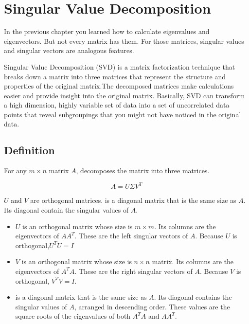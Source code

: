 \chapter{Singular Value Decomposition}

In the previous chapter you learned how to calculate eigenvalues and eigenvectors. But not every matrix has them. For those matrices, singular values and singular vectors are analogous features. 

Singular Value Decomposition (SVD) is a matrix factorization technique that breaks down a matrix into three matrices that represent the structure and properties of the original matrix.The decomposed matrices make calculations easier and provide insight into the original matrix. Basically, SVD can transform a high dimension, highly variable set of data into a set of uncorrelated data points that reveal subgroupings that you might not have noticed in the original data.
 


\section{Definition}

For any $m \times n$ matrix $A$, decomposes the matrix into three matrices.

\begin{equation}
A = U \Sigma V^T
\end{equation}

$U$ and $V$ are orthogonal matrices. \Sigma is a diagonal matrix that is the same size as $A$. Its diagonal contain the singular values of $A$. 

\begin{itemize}
\item $U$ is an orthogonal matrix whose size is $m \times m$. Its columns are the
  eigenvectors of $AA^T$. These are the left singular vectors of $A$. Because $U$ is orthogonal,$U^TU = I$
\item $V$ is an orthogonal matrix whose size is $n \times n$ matrix. Its columns are the
  eigenvectors of $A^TA$. These are the right singular vectors of $A$. Because $V$ is orthogonal, $V^TV = I$.
\item  \Sigma is a diagonal matrix that is the same size as $A$. Its diagonal contains the singular values of $A$, arranged in descending order. These values are the square roots of the eigenvalues of both $A^TA$ and  $AA^T$. 
\end{itemize}


